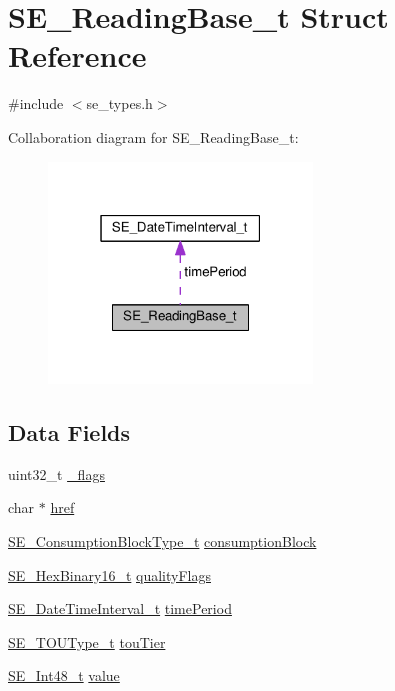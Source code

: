 \hypertarget{structSE__ReadingBase__t}{}\section{S\+E\+\_\+\+Reading\+Base\+\_\+t Struct Reference}
\label{structSE__ReadingBase__t}


{\ttfamily \#include $<$se\+\_\+types.\+h$>$}



Collaboration diagram for S\+E\+\_\+\+Reading\+Base\+\_\+t\+:\nopagebreak
\begin{figure}[H]
\begin{center}
\leavevmode
\includegraphics[width=199pt]{structSE__ReadingBase__t__coll__graph}
\end{center}
\end{figure}
\subsection*{Data Fields}
\begin{DoxyCompactItemize}
\item 
uint32\+\_\+t \hyperlink{group__ReadingBase_ga31f65241519527acecdbec97ead29d78}{\+\_\+flags}
\item 
char $\ast$ \hyperlink{group__ReadingBase_ga5750523127b69f62ba464b3a300e2012}{href}
\item 
\hyperlink{group__ConsumptionBlockType_ga526f797922e4c3009d50c28f457c462e}{S\+E\+\_\+\+Consumption\+Block\+Type\+\_\+t} \hyperlink{group__ReadingBase_ga92c363358c08a8377a2bc6fa4c2bbfca}{consumption\+Block}
\item 
\hyperlink{group__HexBinary16_gac040be0e918a360be6bcf5e8b8ad2c49}{S\+E\+\_\+\+Hex\+Binary16\+\_\+t} \hyperlink{group__ReadingBase_gadb77e76eaaa912c124844cb44f5fa473}{quality\+Flags}
\item 
\hyperlink{structSE__DateTimeInterval__t}{S\+E\+\_\+\+Date\+Time\+Interval\+\_\+t} \hyperlink{group__ReadingBase_gae16dcf4680bc1bdc74ce0a8b3e90919f}{time\+Period}
\item 
\hyperlink{group__TOUType_gadcfd871f87df34ae8228b9484ebedc6a}{S\+E\+\_\+\+T\+O\+U\+Type\+\_\+t} \hyperlink{group__ReadingBase_ga610ccfbc828fc2c3c75d65739dab5991}{tou\+Tier}
\item 
\hyperlink{group__Int48_ga87620025dc9f6c732fa48fcab95861ce}{S\+E\+\_\+\+Int48\+\_\+t} \hyperlink{group__ReadingBase_ga5bf0963cd698da8a48200e661ca04fcc}{value}
\end{DoxyCompactItemize}


